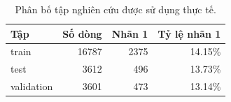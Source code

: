 \begin{table}[H]\centering\small
\caption{Phân bố tập nghiên cứu được sử dụng thực tế.}
\begin{tabular}{@{}lrrr@{}}\toprule
Tập & Số dòng & Nhãn 1 & Tỷ lệ nhãn 1 \\\midrule
train & 16787 & 2375 & 14.15\% \\
test & 3612 & 496 & 13.73\% \\
validation & 3601 & 473 & 13.14\% \\
\bottomrule\end{tabular}
\end{table}
